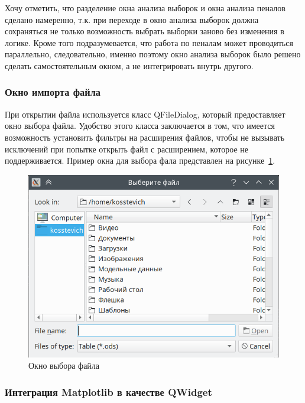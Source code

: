 Хочу отметить, что разделение окна анализа выборок и окна анализа пеналов сделано намеренно, т.к. при переходе в окно анализа выборок должна сохраняться не только возможность выбрать выборки заново без изменения в логике. Кроме того подразумевается, что работа по пеналам может проводиться параллельно, следовательно, именно поэтому окно анализа выборок было решено сделать самостоятельным окном, а не интегрировать внутрь другого.

\subsubsection{Окно импорта файла}

При открытии файла используется класс QFileDialog, который предоставляет окно выбора файла. Удобство этого класса заключается в том, что имеется возможность установить фильтры на расширения файлов, чтобы не вызывать исключений при попытке открыть файл с расширением, которое не поддерживается. Пример окна для выбора фала представлен на рисунке~\ref{fig:ris7}.

\begin{figure}[H]
	\centering
	\includegraphics[width=1\linewidth]{pics/ris7} %
	\caption{Окно выбора файла}
	\label{fig:ris7} %
\end{figure}

\subsubsection{Интеграция Matplotlib в качестве QWidget}

